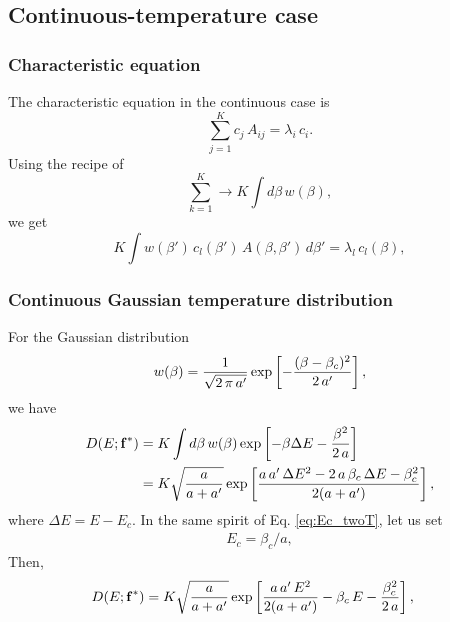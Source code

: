 \documentclass[aip,jcp,preprint,notitlepage, superscriptaddress]{revtex4-1}
\begin{document}
\subsection{Continuous-temperature case}

\subsubsection{Characteristic equation}


The characteristic equation
in the continuous case is
%
\begin{equation}
\sum_{j = 1}^K
  c_j \, A_{ij}
= \lambda_i \, c_i.
\end{equation}
%
Using the recipe of
\[
\sum_{k = 1}^K
\rightarrow
K \int d\beta \, w(\beta),
\]
we get
\begin{equation}
K \int w(\beta') \, c_l(\beta') \, A(\beta, \beta') \, d\beta'
= \lambda_l \, c_l(\beta),
\tag{B9}
\label{eq:eig_continuous}
\end{equation}



\subsubsection{Continuous Gaussian temperature distribution}



For the Gaussian distribution
\begin{align}
w(\beta)
=
\frac{1}{\sqrt{2 \, \pi \, a'}}
\exp\left[
  -\frac{ (\beta - \beta_c)^2 }{ 2 \, a' }
\right],
\notag
\end{align}
%
we have
%
\begin{align*}
D(E; \bm{\mathrm{f}}^*)
&=
K \int d\beta \, w(\beta)
\exp\left[
  -\beta \Delta E -\frac{ \beta^2 }{ 2 \, a}
\right]
\\
&=
K \sqrt{\frac{a}{a+a'}}
\exp\left[
\frac{
  a \, a' \, \Delta E^2
  - 2 \, a \, \beta_c \, \Delta E
  - \beta_c^2
}
{
  2 (a + a')
}
\right],
\end{align*}
where $\Delta E = E - E_c$.
%
In the same spirit of Eq. \eqref{eq:Ec_twoT},
let us set
\begin{align}
E_c = \beta_c / a,
\label{eq:Ec_cont}
\end{align}
%
Then,
\begin{align*}
D(E; \bm{\mathrm{f}}^*)
&=
K \sqrt{\frac{a}{a+a'}}
\exp\left[
\frac{
  a \, a' \, E^2
}
{
  2 (a + a')
}
-\beta_c \, E
-\frac{\beta_c^2}{2 \, a}
\right],
\end{align*}
\end{document}
